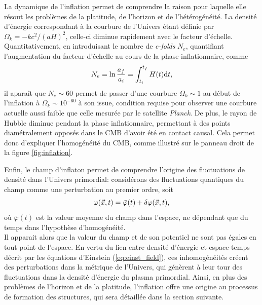 La dynamique de l'inflation permet de comprendre la raison pour laquelle elle résout les problèmes de la platitude, de l'horizon et de l'hétérogénéité.
La densité d'énergie correspondant à la courbure de l'Univers étant définie par $\Omega_k = -kc^2 / (aH)^2$, celle-ci diminue rapidement avec le facteur d'échelle.
Quantitativement, en introduisant le nombre de \textit{e-folds} $N_e$, quantifiant l'augmentation du facteur d'échelle au cours de la phase inflationnaire, comme
\begin{equation}
    N_e = \ln \frac{a_f}{a_i} = \int_{t_i}^{t_f} H(t) \mathrm{d} t,
\end{equation}
il aparaît que $N_e \sim 60$ permet de passer d'une courbure $\Omega_k \sim 1$ au début de l'inflation à $\Omega_k \sim 10^{-60}$ à son issue, condition requise pour observer une courbure actuelle aussi faible que celle mesurée par le satellite \textit{Planck}.
De plus, le rayon de Hubble diminue pendant la phase inflationnaire, permettant à des points diamétralement opposés dans le CMB d'avoir été en contact causal.
Cela permet donc d'expliquer l'homogénéité du CMB, comme illustré sur le panneau droit de la figure \ref{fig:inflation}.

Enfin, le champ d'inflaton permet de comprendre l'origine des fluctuations de densité dans l'Univers primordial: considérons des fluctuations quantiques du champ comme une perturbation au premier ordre, soit
\begin{equation}
    \varphi(\vec{x}, t) = \bar{\varphi}(t) + \delta\varphi(\vec{x}, t),
\end{equation}
où $\bar{\varphi}(t)$ est la valeur moyenne du champ dans l'espace, ne dépendant que du temps dans l'hypothèse d'homogénéité. \\
Il apparait alors que la valeur du champ et de son potentiel ne sont pas égales en tout point de l'espace.
En vertu du lien entre densité d'énergie et espace-temps décrit par les équations d'Einstein (\ref{eq:einst_field}), ces inhomogénéités créent des perturbations dans la métrique de l'Univers, qui génèrent à leur tour des fluctuations dans la densité d'énergie du plasma primordial.
Ainsi, en plus des problèmes de l'horizon et de la platitude, l'inflation offre une origine au processus de formation des structures, qui sera détaillée dans la section suivante.

